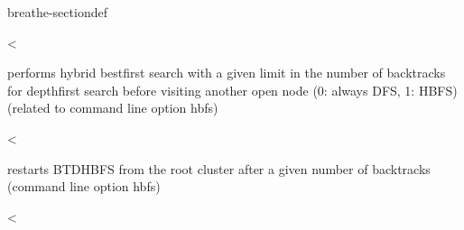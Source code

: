 \documentclass[letterpaper,10pt,openany,oneside,english]{sphinxmanual}
\begin{document}
\begin{fulllineitems}
\begin{sphinxuseclass}{breathe-sectiondef}
\begin{fulllineitems}
\label{\detokenize{ref/ref_cpp:_CPPv4N8ToulBar215hbfsGlobalLimitE}}\label{\detokenize{ref/ref_cpp:_CPPv3N8ToulBar215hbfsGlobalLimitE}}\label{\detokenize{ref/ref_cpp:_CPPv2N8ToulBar215hbfsGlobalLimitE}}\label{\detokenize{ref/ref_cpp:ToulBar2::hbfsGlobalLimit__Long}}
\pysigstartsignatures
\pysigstartmultiline
{}
\pysigstopmultiline
\pysigstopsignatures
\sphinxAtStartPar
\textless{} 

\sphinxAtStartPar
performs hybrid best\sphinxhyphen{}first search with a given limit in the number of backtracks for depth\sphinxhyphen{}first search before visiting another open node (0: always DFS, 1: HBFS) (related to command line option \sphinxhyphen{}hbfs) 

\end{fulllineitems}


\begin{fulllineitems}
\label{\detokenize{ref/ref_cpp:_CPPv4N8ToulBar29hbfsAlphaE}}\label{\detokenize{ref/ref_cpp:_CPPv3N8ToulBar29hbfsAlphaE}}\label{\detokenize{ref/ref_cpp:_CPPv2N8ToulBar29hbfsAlphaE}}\label{\detokenize{ref/ref_cpp:ToulBar2::hbfsAlpha__Long}}
\pysigstartsignatures
\pysigstartmultiline
{}
\pysigstopmultiline
\pysigstopsignatures
\sphinxAtStartPar
\textless{} 

\sphinxAtStartPar
restarts BTD\sphinxhyphen{}HBFS from the root cluster after a given number of backtracks (command line option \sphinxhyphen{}hbfs) 

\end{fulllineitems}


\begin{fulllineitems}
\label{\detokenize{ref/ref_cpp:_CPPv4N8ToulBar28hbfsBetaE}}\label{\detokenize{ref/ref_cpp:_CPPv3N8ToulBar28hbfsBetaE}}\label{\detokenize{ref/ref_cpp:_CPPv2N8ToulBar28hbfsBetaE}}\label{\detokenize{ref/ref_cpp:ToulBar2::hbfsBeta__Long}}
\pysigstartsignatures
\pysigstartmultiline
{}
\pysigstopmultiline
\pysigstopsignatures
\sphinxAtStartPar
\textless{} 


\end{fulllineitems}
\end{sphinxuseclass}
\end{fulllineitems}
\end{document}
